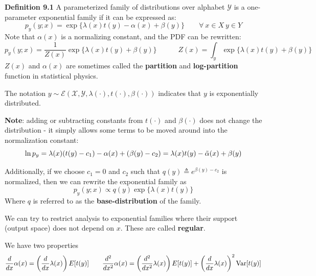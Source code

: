 \documentclass[12pt]{article} %
\begin{document}
\newpage

\textbf{Definition 9.1} A parameterized family of distributions over alphabet $\mathcal{Y}$ is a one-parameter exponential family if it can be expressed as:
\begin{equation*}
    p_y(y;x) = \exp\{
    \lambda(x) t(y)  - \alpha(x) + \beta(y)
    \} \qquad \forall \ x \in X\ y \in Y
\end{equation*}
Note that $\alpha(x)$ is a normalizing constant, and the PDF can be rewritten:
\begin{equation*}
    p_y(y;x) = \frac{1}{Z(x)}
    \exp\{
    \lambda(x) t(y) + \beta(y)
    \} 
    \qquad \quad
    Z(x) = \int_y \exp\{
    \lambda(x) t(y) + \beta(y)
    \}
\end{equation*}
$Z(x)$ and $\alpha(x)$ are sometimes called the \textbf{partition} and \textbf{log-partition} function in statistical physics.

The notation $y \sim \mathcal{E}(\mathcal{X}, \mathcal{Y}, \lambda(\cdot),t(\cdot),\beta(\cdot))$ indicates that $y$ is exponentially distributed.

\textbf{Note}: adding or subtracting constants from $t(\cdot)$ and $\beta(\cdot)$ does not change the distribution - it simply allows some terms to be moved around into the normalization constant:
\begin{equation*}
    \ln p_y = \lambda(x)(t(y) - c_1) - \alpha(x) + (\beta(y) - c_2) = \lambda(x)t(y) - \Tilde{\alpha}(x) + \beta(y)
\end{equation*}

Additionally, if we choose $c_1 = 0$ and $c_2$ such that $q(y)\triangleq e^{\beta(y) - c_2}$ is normalized, then we can rewrite the exponential family as
\begin{equation*}
    p_y(y;x) \propto q(y) \exp\{\lambda(x) t(y)\}
\end{equation*}
Where $q$ is referred to as the \textbf{base-distribution} of the family.

We can try to restrict analysis to exponential families where their support (output space) does not depend on $x$. These are called \textbf{regular}.

\separate

We have two properties
\begin{equation*}
    \frac{d}{dx} \alpha(x) = 
    \left(
    \frac{d}{dx}\lambda(x) 
    \right)
    E[t(y)]
    \qquad
    \frac{d^2}{dx^2} \alpha(x) = 
    \left(
    \frac{d^2}{dx^2}\lambda(x) 
    \right)
    E[t(y)]
    +
    \left(
    \frac{d}{dx}\lambda(x) 
    \right)^2
    \text{Var}[t(y)]
\end{equation*}
\end{document}

